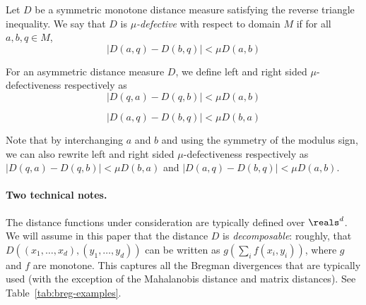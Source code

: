 \documentclass[11pt]{myclass}
\begin{document}
\begin{defn}[$\mu$-defectiveness] \label{musimdefn}
Let $D$ be a symmetric monotone distance measure satisfying the reverse triangle inequality. We say that 
$D$ is \emph{$\mu$-defective} with respect to domain $M$ if for all $a,b,q \in M$,
\begin{equation}
|D(a,q) - D(b,q)| <  \mu D(a,b)
\end{equation}

For an asymmetric distance measure $D$, we define left and right sided $\mu$-defectiveness respectively as 
\begin{equation}
|D(q,a) - D(q,b)| < \mu D(a,b)
\end{equation}

\begin{equation}|D(a,q) - D(b,q)| < \mu D(b,a)
\end{equation}


Note that by interchanging $a$ and $b$ and using the symmetry of the modulus sign, we can also rewrite left and right sided 
$\mu$-defectiveness respectively as  $|D(q,a) - D(q,b)| < \mu D(b,a)$ and $|D(a,q) - D(b,q)| < \mu D(a,b)$.
\end{defn}

\paragraph{Two technical notes.} The distance functions under consideration are typically defined over $\reals^d$. We will assume in this paper that the distance $D$ is \emph{decomposable}: roughly, that $D((x_1, \ldots, x_d), (y_1, \ldots, y_d))$ can be written as $g( \sum_i f(x_i, y_i))$, where $g$ and $f$ are monotone. This captures all the Bregman divergences that are typically used (with the exception of the Mahalanobis distance and matrix distances). See Table~\ref{tab:breg-examples}.
\end{document}
